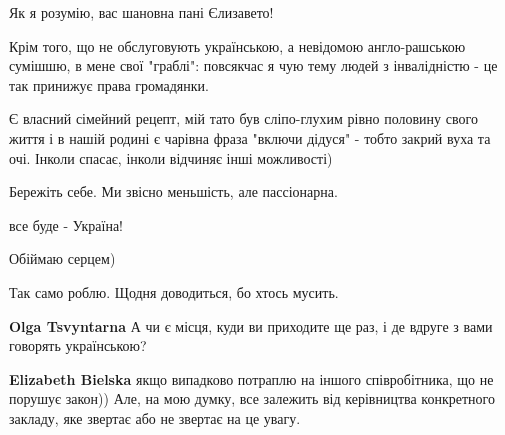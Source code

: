 \begin{itemize}
 

Як я розумію, вас шановна пані Єлизавето!

Крім того, що не обслуговують українською, а невідомою англо-рашською сумішшю,
в мене свої "граблі": повсякчас я чую тему людей з інвалідністю - це так
принижує права громадянки.

Є власний сімейний рецепт, мій тато був сліпо-глухим рівно половину свого життя
і в нашій родині є чарівна фраза "включи дідуся" - тобто закрий вуха та очі.
Інколи спасає, інколи відчиняє інші можливості)

Бережіть себе. Ми звісно меньшість, але пассіонарна.

все буде - Україна!

Обіймаю серцем)

 
Так само роблю. Щодня доводиться, бо хтось мусить.

\begin{itemize}
 
\textbf{Olga Tsvyntarna} А чи є місця, куди ви приходите ще раз, і де вдруге з вами говорять українською?

 
\textbf{Elizabeth Bielska} якщо випадково потраплю на іншого співробітника, що не порушує закон)) Але, на мою думку, все залежить від керівництва конкретного закладу, яке звертає або не звертає на це увагу.
\end{itemize}

 


\end{itemize}
